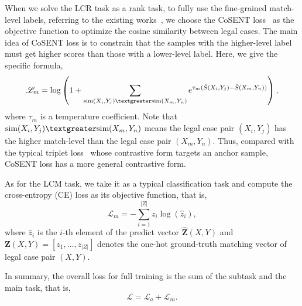 When we solve the LCR task as a rank task, to fully use the fine-grained match-level labels,
referring to the existing works~\cite{gong2023transferable,liu2022ynu},
we choose the CoSENT loss~\cite{huang2024cosent} as the objective function to optimize the cosine similarity between legal cases.
The main idea of CoSENT loss is to constrain that the samples with the higher-level label must get higher scores than those with a lower-level label. Here, we give the specific formula,
\[
\mathscr{L}_{m} = \log\left(1+ \sum_{\text{sim}(X_{i}, Y_{j}) \textgreater \text{sim}(X_{m}, Y_{n})} e^{\tau_{m}(\hat{S}(X_{i}, Y_{j})- \hat{S}(X_{m}, Y_{n}))}\right),
\]
where $\tau_{m}$ is a temperature coefficient.
Note that $\text{sim}(X_{i}, Y_{j}) \textgreater \text{sim}(X_{m}, Y_{n})$ means the legal case pair $(X_i, Y_j)$ has the higher match-level than the legal case pair $(X_m,Y_n)$.
Thus, compared with the typical triplet loss~\cite{chechik2010TripletLoss} whose contrastive form targets an anchor sample, CoSENT loss has a more general contrastive form.

 As for the LCM task, we take it as a typical classification task and compute the cross-entropy (CE) loss as its objective function, that is,
\[
\mathscr{L}_{m} = -\sum_{i=1}^{|Z|} {z}_{i}\log({\hat{z}_{i}}),
\]
where $\hat{z}_{i}$ is the $i$-th element of the predict vector $\hat{\textbf{Z}}(X, Y)$ and $\textbf{Z}(X, Y) = [z_1, \ldots, z_{|Z|}]$ denotes the one-hot ground-truth matching vector of legal case pair $(X, Y)$.

In summary, the overall loss for full training is the sum of the subtask and the main task, that is,
\[
\mathscr{L} = \mathscr{L}_{a} + \mathscr{L}_{m}.
\]

